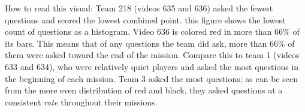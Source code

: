 \documentclass[10pt]{article}
\begin{document}
    How to read this visual:
Team 218 (videos 635 and 636) asked the fewest questions and scored the lowest combined point. this figure shows the lowest count of questions as a histogram. Video 636 is colored red in more than 66\% of its bars. This means that of any questions the team did ask, more than 66\% of them were asked toward the end of the mission. Compare this to team 1 (videos 633 and 634), who were relatively quiet players and asked the most questions in the beginning of each mission. Team 3 asked the most questions; as can be seen from the more even distribution of red and black, they asked questions at a consistent \emph{rate} throughout their missions.


\clearpage

\begin{figure}[h!]
    \centering
    \caption{}
    \end{figure}


\clearpage

\begin{figure}[h!]
    \centering
    \caption{}
    \end{figure}
\clearpage
\end{document}
